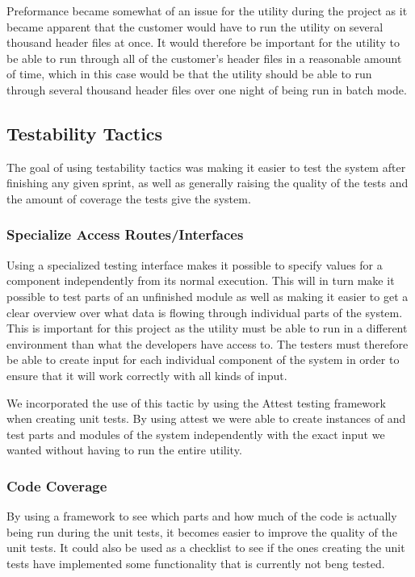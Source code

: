 Preformance became somewhat of an issue for the utility during the project as it became apparent that the customer would have to run the utility on several thousand header files at once. It would therefore be important for the utility to be able to run through all of the customer's header files in a reasonable amount of time, which in this case would be that the utility should be able to run through several thousand header files over one night of being run in batch mode.

\subsection{Testability Tactics}
The goal of using testability tactics was making it easier to test the system after finishing any given sprint, as well as generally raising the quality of the tests and the amount of coverage the tests give the system.

\subsubsection{Specialize Access Routes/Interfaces}
Using a specialized testing interface makes it possible to specify values for a component independently from its normal execution. This will in turn make it possible to test parts of an unfinished module as well as making it easier to get a clear overview over what data is flowing through individual parts of the system. This is important for this project as the \gls{utility} must be able to run in a different environment than what the developers have access to. The testers must therefore be able to create input for each individual component of the system in order to ensure that it will work correctly with all kinds of input.

We incorporated the use of this tactic by using the Attest testing framework when creating unit tests. By using attest we were able to create instances of and test parts and modules of the system independently with the exact input we wanted without having to run the entire utility. 

\subsubsection{Code Coverage}
By using a framework to see which parts and how much of the code is actually being run during the unit tests, it becomes easier to improve the quality of the unit tests. It could also be used as a checklist to see if the ones creating the unit tests have implemented some functionality that is currently not beng tested.

